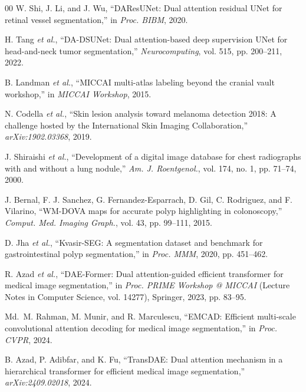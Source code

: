 \documentclass[conference]{IEEEtran}
\begin{document}
\begin{thebibliography}{00}
W. Shi, J. Li, and J. Wu, ``DAResUNet: Dual attention residual UNet for retinal vessel segmentation,'' in \textit{Proc. BIBM}, 2020.

H. Tang \textit{et al.}, ``DA-DSUNet: Dual attention-based deep supervision UNet for head-and-neck tumor segmentation,'' \textit{Neurocomputing}, vol. 515, pp. 200--211, 2022.

B. Landman \textit{et al.}, ``MICCAI multi-atlas labeling beyond the cranial vault workshop,'' in \textit{MICCAI Workshop}, 2015.

N. Codella \textit{et al.}, ``Skin lesion analysis toward melanoma detection 2018: A challenge hosted by the International Skin Imaging Collaboration,'' \textit{arXiv:1902.03368}, 2019.

J. Shiraishi \textit{et al.}, ``Development of a digital image database for chest radiographs with and without a lung nodule,'' \textit{Am. J. Roentgenol.}, vol. 174, no. 1, pp. 71--74, 2000.

J. Bernal, F. J. Sanchez, G. Fernandez-Esparrach, D. Gil, C. Rodriguez, and F. Vilarino, ``WM-DOVA maps for accurate polyp highlighting in colonoscopy,'' \textit{Comput. Med. Imaging Graph.}, vol. 43, pp. 99--111, 2015.

D. Jha \textit{et al.}, ``Kvasir-SEG: A segmentation dataset and benchmark for gastrointestinal polyp segmentation,'' in \textit{Proc. MMM}, 2020, pp. 451--462.

R. Azad \textit{et al.}, ``DAE-Former: Dual attention-guided efficient transformer for medical image segmentation,'' in \textit{Proc. PRIME Workshop @ MICCAI} (Lecture Notes in Computer Science, vol. 14277), Springer, 2023, pp. 83--95.

Md.\ M. Rahman, M. Munir, and R. Marculescu, ``EMCAD: Efficient multi-scale convolutional attention decoding for medical image segmentation,'' in \textit{Proc. CVPR}, 2024.

B. Azad, P. Adibfar, and K. Fu, ``TransDAE: Dual attention mechanism in a hierarchical transformer for efficient medical image segmentation,'' \textit{arXiv:2409.02018}, 2024.

\end{thebibliography}
\end{document}
